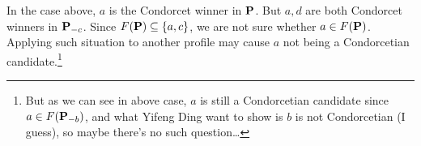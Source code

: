In the case above, $a$ is the Condorcet winner in $\mathbf{P}$. But $a,d$ are both Condorcet winners in $\mathbf{P}_{-c}$. Since $F(\mathbf{P}) \subseteq \{a,c\}$, we are not sure whether $a \in F(\mathbf{P})$. Applying such situation to another profile may cause $a$ not being a Condorcetian candidate.\footnote{But as we can see in above case, $a$ is still a Condorcetian candidate since $a \in F(\mathbf{P}_{-b})$, and what Yifeng Ding want to show is $b$ is not Condorcetian (I guess), so maybe there's no such question\dots}